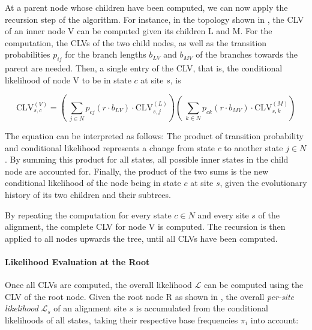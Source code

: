 At a parent node whose children have been computed, we can now apply the recursion step of the algorithm.
For instance, in the topology shown in , the CLV of an inner node {\sffamily V}
can be computed given its children {\sffamily L} and {\sffamily M}.
For the computation, the CLVs of the two child nodes,
as well as the transition probabilities $p_{ij}$ for the branch lengths $b_{LV}$ and $b_{MV}$
of the branches towards the parent are needed.
Then, a single entry of the CLV, that is,
the conditional likelihood of node {\sffamily V} to be in state $c$ at site $s$, is

\begin{equation}
    \label{ch:Foundations:sec:MLTreeInference:eq:CLV}
    \mbox{CLV}^{(V)}_{s,c} =
    \left(~ \sum_{j \in N} p_{cj}(r \cdot b_{LV}) \cdot \mbox{CLV}^{(L)}_{s,j} \right)
    \left(~ \sum_{k \in N} p_{ck}(r \cdot b_{MV}) \cdot \mbox{CLV}^{(M)}_{s,k} \right)
\end{equation}

The equation can be interpreted as follows:
The product of transition probability and conditional likelihood represents a change from state $c$ to another state $j \in N$.
By summing this product for all states, all possible inner states in the child node are accounted for.
Finally, the product of the two sums is the new conditional likelihood of the node being in state $c$ at site $s$,
given the evolutionary history of its two children and their subtrees.

By repeating the computation for every state $c \in N$ and every site $s$ of the alignment,
the complete CLV for node {\sffamily V} is computed.
The recursion is then applied to all nodes upwards the tree, until all CLVs have been computed.

\paragraph{Likelihood Evaluation at the Root}
\label{ch:Foundations:sec:MLTreeInference:sub:LikelihoodComputations:par:RootLikelihood}

Once all CLVs are computed, the overall likelihood $\mathcal{L}$ can be computed using the CLV of the root node.
Given the root node {\sffamily R} as shown in ,
the overall \emph{per-site likelihood} $\mathcal{L}_s$ of an alignment site $s$ is
accumulated from the conditional likelihoods of all states,
taking their respective base frequencies $\pi_i$ into account:

